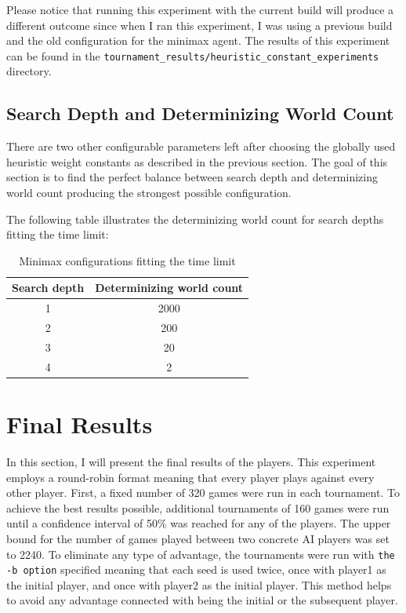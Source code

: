 Please notice that running this experiment with the current build will produce a different outcome since when I ran this experiment, I was using a previous build
and the old configuration for the minimax agent. The results of this experiment can be found in the \texttt{tournament\_results/heuristic\_constant\_experiments} directory.


\subsection{Search Depth and Determinizing World Count}

There are two other configurable parameters left after choosing the globally used heuristic weight constants as described in the previous section.
The goal of this section is to find the perfect balance between search depth and determinizing world count producing the strongest possible configuration.

The following table illustrates the determinizing world count for search depths fitting the time limit:

\begin{table}[H] 
    \centering
    \begin{tabular}{|c|c|}
        \hline 
        \textbf{Search depth} & \textbf{Determinizing world count} \\ \hline
        1 & 2000 \\ \hline
        2 & 200 \\ \hline
        3 & 20 \\ \hline
        4 & 2 \\ \hline
    \end{tabular}
    \caption{Minimax configurations fitting the time limit}
\end{table}




\section{Final Results}

In this section, I will present the final results of the players. This experiment employs a round-robin format meaning that every player plays against every other player.
First, a fixed number of 320 games were run in each tournament. To achieve the best results possible, additional tournaments of 160 games were run until a confidence interval
of 50\% was reached for any of the players. The upper bound for the number of games played between two concrete AI players was set to 2240. 
To eliminate any type of advantage, the tournaments were run with \texttt{the -b option} specified meaning that each seed is used twice, once with player1 as the initial player, 
and once with player2 as the initial player. This method helps to avoid any advantage connected with being the initial or the subsequent player. 

